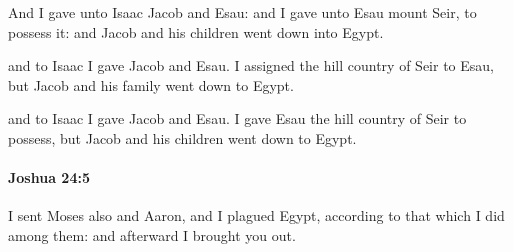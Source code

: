 			\begin{versebox}
					\item[BHS] 
					\item[ASV] And I gave unto Isaac Jacob and Esau: and I gave unto Esau mount Seir, to possess it: and Jacob and his children went down into Egypt.
					\item[NIV] and to Isaac I gave Jacob and Esau. I assigned the hill country of Seir to Esau, but Jacob and his family went down to Egypt.
					\item[NRSV] and to Isaac I gave Jacob and Esau. I gave Esau the hill country of Seir to possess, but Jacob and his children went down to Egypt.
			\end{versebox}

		\paragraph{Joshua 24:5} %
			\label{JOSHUA-24-5}

			I sent Moses also and Aaron, and I plagued Egypt, according to that which I did among them: and afterward I brought you out.

